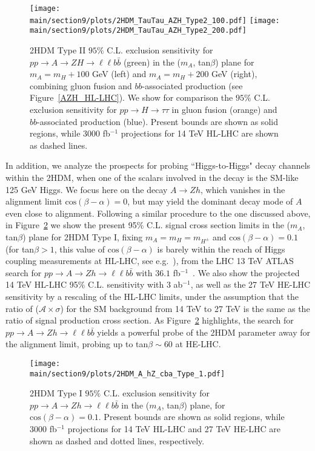\begin{figure}[h!]
\begin{center}
\texttt{[image: \\main/section9/plots/2HDM\_TauTau\_AZH\_Type2\_100.pdf]}
\hspace{3mm}
\texttt{[image: \\main/section9/plots/2HDM\_TauTau\_AZH\_Type2\_200.pdf]}
\caption{\small 2HDM Type II $95\%$ C.L. exclusion sensitivity for $p p \to A \to Z H \to \ell\ell b \bar{b}$  (green)
in the ($m_{A}$, tan$\beta$) plane for $m_A = m_H +100$ GeV (left) and $m_A = m_H +200$ GeV (right), combining 
gluon fusion and $bb$-associated production (see Figure~\ref{AZH_HL-LHC}). We show for comparison
the $95\%$ C.L. exclusion sensitivity for $p p \to H \to \tau\tau$ in gluon fusion (orange) 
and $bb$-associated production (blue). Present bounds are shown as solid regions, while $3000$ fb$^{-1}$ projections for 14 TeV HL-LHC are shown as dashed lines.}
\label{TauTau_AZH_HL-HE}
\end{center}
\end{figure}

In addition, we analyze the prospects for probing ``Higgs-to-Higgs" decay channels within the 2HDM, when one of the scalars involved in the decay is the SM-like 125 GeV Higgs. We focus here on the decay $A \to Z h$, which vanishes in the alignment limit $\mathrm{cos}(\beta - \alpha) = 0$, but may yield the dominant decay mode of $A$ even close to alignment. Following a similar procedure to the one discussed above, in Figure~\ref{A_hZ_HL-HE} we show the present 95$\%$ C.L. signal cross section limits in the ($m_{A}$, tan$\beta$) plane for 2HDM Type I, fixing $m_A = m_H = m_{H^{\pm}}$ and $\mathrm{cos}(\beta-\alpha) = 0.1$ (for tan$\beta > 1$, this value of $\mathrm{cos}(\beta-\alpha)$ is barely within the reach of Higgs coupling measurements at HL-LHC, see e.g.~\cite{ATL-PHYS-PUB-2014-017}), from the LHC 13 TeV ATLAS search for $p p \to A \to Z h \to \ell\ell b \bar{b}$ with $36.1$ fb$^{-1}$~\cite{Aaboud:2017cxo}. We also show the projected 14 TeV HL-LHC 95$\%$ C.L. sensitivity with $3$ ab$^{-1}$, as well as the 27 TeV HE-LHC sensitivity by a rescaling of the HL-LHC limits, under the assumption that the ratio of ($\mathcal{A} \times \sigma$) for the SM background from 14 TeV to 27 TeV is the same as the ratio of signal production cross section.
As Figure~\ref{A_hZ_HL-HE} highlights, the search for $p p \to A \to Z h \to \ell\ell b \bar{b}$ yields a powerful probe of the 2HDM parameter away for the alignment limit, probing up to tan$\beta \sim 60$ at HE-LHC.

\begin{figure}[h!]
\begin{center}
\texttt{[image: \\main/section9/plots/2HDM\_A\_hZ\_cba\_Type\_1.pdf]}
\caption{\small 2HDM Type I $95\%$ C.L. exclusion sensitivity for $p p \to A \to Z h \to \ell\ell b \bar{b}$ 
in the ($m_{A}$, tan$\beta$) plane, for $\mathrm{cos}(\beta-\alpha) = 0.1$. 
Present bounds are shown as solid regions, while $3000$ fb$^{-1}$ projections for 14 TeV HL-LHC and 27 TeV HE-LHC
are shown as dashed and dotted lines, respectively.}
\label{A_hZ_HL-HE}
\end{center}
\end{figure}


